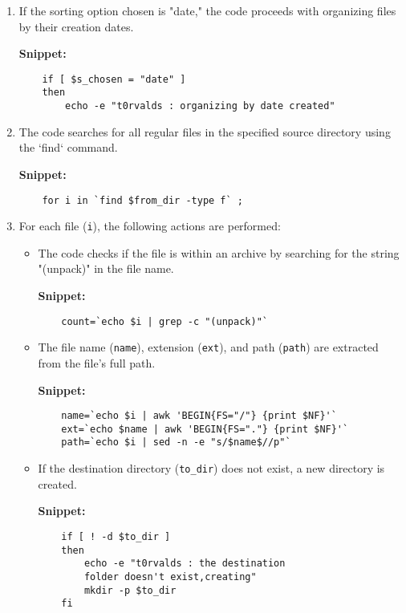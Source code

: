 \documentclass[12pt]{article}
\begin{document}
    \begin{enumerate}
      \item If the sorting option chosen is "date," the code proceeds with organizing files by their creation dates.
      
      \textbf{Snippet:}
    \begin{verbatim}
    if [ $s_chosen = "date" ]
    then
        echo -e "t0rvalds : organizing by date created"
    \end{verbatim}
      
      \item The code searches for all regular files in the specified source directory using the `find` command.
      
      \textbf{Snippet:}
    \begin{verbatim}
    for i in `find $from_dir -type f` ;
    \end{verbatim}
      
      \item For each file (\texttt{i}), the following actions are performed:
        \begin{itemize}
          \item The code checks if the file is within an archive by searching for the string "(unpack)" in the file name.
          
          \textbf{Snippet:}
    \begin{verbatim}
    count=`echo $i | grep -c "(unpack)"`
    \end{verbatim}
          
          \item The file name (\texttt{name}), extension (\texttt{ext}), and path (\texttt{path}) are extracted from the file's full path.
          
          \textbf{Snippet:}
    \begin{verbatim}
    name=`echo $i | awk 'BEGIN{FS="/"} {print $NF}'`
    ext=`echo $name | awk 'BEGIN{FS="."} {print $NF}'`
    path=`echo $i | sed -n -e "s/$name$//p"`
    \end{verbatim}
          
          \item If the destination directory (\texttt{to\_dir}) does not exist, a new directory is created.
          
          \textbf{Snippet:}
          \begin{verbatim}
    if [ ! -d $to_dir ]
    then
        echo -e "t0rvalds : the destination 
        folder doesn't exist,creating"
        mkdir -p $to_dir
    fi
    \end{verbatim}
          

\end{itemize}
\end{enumerate}
\end{document}
